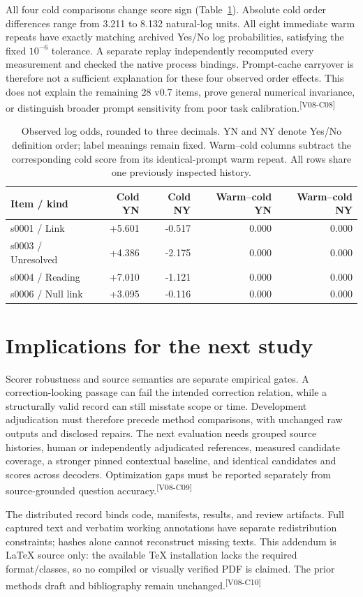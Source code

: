 \documentclass[10pt,letterpaper]{article}
\newcommand{\claim}[1]{\textsuperscript{\scriptsize[#1]}}
\begin{document}
All four cold comparisons change score sign (Table~\ref{tab:control}).
Absolute cold order differences range from 3.211 to 8.132 natural-log units.
All eight immediate warm repeats have exactly matching archived Yes/No log
probabilities, satisfying the fixed $10^{-6}$ tolerance. A separate replay
independently recomputed every measurement and checked the native process
bindings. Prompt-cache carryover is therefore not a sufficient explanation
for these four observed order effects. This does not explain the remaining
28 v0.7 items, prove general numerical invariance, or distinguish broader
prompt sensitivity from poor task calibration.\claim{V08-C08}

\begin{table}[ht]
\centering
\small
\begin{tabular}{lrrrr}
\toprule
Item / kind & Cold YN & Cold NY & Warm--cold YN & Warm--cold NY \\
\midrule
s0001 / Link & +5.601 & -0.517 & 0.000 & 0.000 \\
s0003 / Unresolved & +4.386 & -2.175 & 0.000 & 0.000 \\
s0004 / Reading & +7.010 & -1.121 & 0.000 & 0.000 \\
s0006 / Null link & +3.095 & -0.116 & 0.000 & 0.000 \\
\bottomrule
\end{tabular}
\caption{Observed log odds, rounded to three decimals. YN and NY denote
Yes/No definition order; label meanings remain fixed. Warm--cold columns
subtract the corresponding cold score from its identical-prompt warm repeat.
All rows share one previously inspected history.}
\label{tab:control}
\end{table}


\section{Implications for the next study}
\label{sec:next}
Scorer robustness and source semantics are separate empirical gates. A
correction-looking passage can fail the intended correction relation, while
a structurally valid record can still misstate scope or time. Development
adjudication must therefore precede method comparisons, with unchanged raw
outputs and disclosed repairs. The next evaluation needs grouped source
histories, human or independently adjudicated references, measured candidate
coverage, a stronger pinned contextual baseline, and identical candidates and
scores across decoders. Optimization gaps must be reported separately from
source-grounded question accuracy.\claim{V08-C09}

The distributed record binds code, manifests, results, and review artifacts.
Full captured text and verbatim working annotations have separate
redistribution constraints; hashes alone cannot reconstruct missing texts.
This addendum is LaTeX source only: the available TeX installation lacks the
required format/classes, so no compiled or visually verified PDF is claimed.
The prior methods draft and bibliography remain unchanged.\claim{V08-C10}
\end{document}
